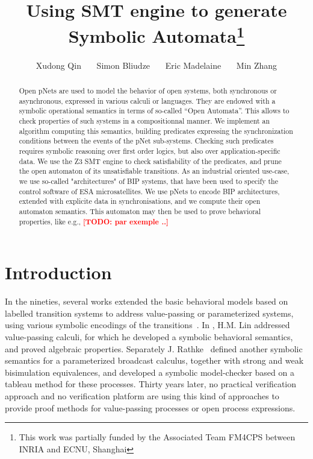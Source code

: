 \documentclass{lncs/llncs}
\title{Using SMT engine to generate Symbolic Automata\thanks{This work was partially 
funded by the Associated Team FM4CPS
  between INRIA and ECNU, Shanghai}}
\author{ Xudong Qin\inst{1,2}  \ \ \  Simon Bliudze\inst{3} \ \ \ Eric Madelaine\inst{1}
  \ \ \  Min Zhang\inst{2}}
\institute{Universit\'e C\^ote d'Azur, Inria, CNRS, I3S, 06902 Sophia Antipolis, France
        \and Shanghai Key Laboratory of Trustworthy Computing, ECNU, China
\and INRIA Lille -- Nord Europe, 40 avenue Halley,
59650 Villeneuve d'Ascq
France}
\date{}                                           %
\newcommand{\TODO}[1]{\textcolor{red}{\textbf{[TODO:#1]}}}
\begin{document}
\maketitle



\begin{abstract}
Open pNets are used to model the behavior of open systems, both
synchronous or asynchronous, expressed in various calculi or
languages. They are endowed with a symbolic operational semantics in
terms of so-called ``Open Automata''. This allows to check properties of
such systems in a compositionnal manner. 
We implement an algorithm computing this semantics,
building predicates expressing the synchronization conditions
between the events of the pNet sub-systems. Checking such
predicates requires symbolic reasoning over first order logics, but
also over application-specific data. We use the Z3 SMT engine to check
satisfiability of the predicates, and prune the open automaton of its
unsatisfiable transitions.
As an industrial oriented use-case, we use so-called "architectures"
of BIP systems, that have been used to specify the control software of
ESA microsatellites. We use pNets to encode BIP architectures,
extended with explicite data in synchronisations, and we compute their
open automaton semantics. This automaton may then be used to prove
behavioral properties, like e.g., \TODO{ par exemple ..} 

  

\end{abstract}


\section{Introduction}

In the nineties, several 
works extended the basic behavioral models based on labelled
transition systems to address value-passing or parameterized systems, using
various symbolic encodings of the
transitions~\cite{deSimone85,Larsen87,HennessyLin:TCS95,Linconcur96}. 
In \cite{Linconcur96}, H.M. Lin addressed value-passing calculi, for which he
developed a symbolic behavioral semantics, and proved algebraic properties.
Separately J. Rathke~\cite{HennessyRathke:TCS98} defined another
symbolic semantics for 
a parameterized broadcast calculus, together with strong and weak bisimulation
equivalences, and developed a symbolic model-checker based on a tableau
method for these processes. Thirty years later, no
practical verification approach and no verification platform are
using this kind of approaches to provide proof methods for
value-passing processes or open process expressions. 
\end{document}
